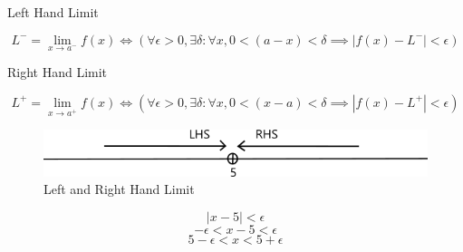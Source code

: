 \documentclass[12pt]{article}
\begin{document}
\begin{definition}{Left Hand Limit}

\[
    L^- = \lim_{x \to a^-} f(x) \iff \left( \forall\epsilon>0,\exists\delta : \forall x, 0<(a-x)<\delta \implies |f(x)-L^-|<\epsilon \right) 
\]
\end{definition}
\begin{definition}{Right Hand Limit}

\[
    L^+ = \lim_{x \to a^+} f(x) \iff \left( \forall\epsilon>0,\exists\delta : \forall x, 0<(x-a)<\delta \implies |f(x)-L^+|<\epsilon \right) 
\]
\end{definition}

\begin{figure}[htpb]
    \centering
    \includegraphics[scale=0.5]{Limit1.png}
    \caption{\small Left and Right Hand Limit}
\end{figure}
\[ |x-5| < \epsilon \]
\[ -\epsilon < x-5 < \epsilon \]
\[ 5-\epsilon < x < 5+\epsilon \]






    
\end{document}
